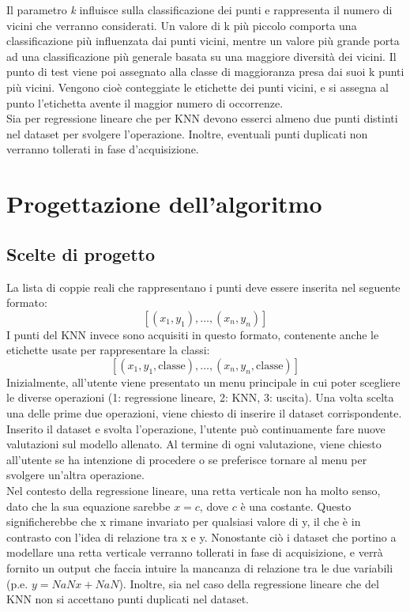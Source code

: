 \documentclass[11pt]{article}
\theoremstyle{definition}
\begin{document}
Il parametro \textit{k} influisce sulla classificazione dei punti e rappresenta il numero di vicini che verranno considerati. Un valore di k più piccolo comporta una classificazione più influenzata dai punti vicini, mentre un valore più grande porta ad una classificazione più generale basata su una maggiore diversità dei vicini. Il punto di test viene poi assegnato alla classe di maggioranza presa dai suoi k punti più vicini. Vengono cioè conteggiate le etichette dei punti vicini, e si assegna al punto l'etichetta avente il maggior numero di occorrenze.\\
\newline
Sia per regressione lineare che per KNN devono esserci almeno due punti distinti nel dataset per svolgere l'operazione. Inoltre, eventuali punti duplicati non verranno tollerati in fase d'acquisizione.

\newpage

\section{Progettazione dell'algoritmo}

\subsection{Scelte di progetto}
La lista di coppie reali che rappresentano i punti deve essere inserita nel seguente formato:
$$
[(x_1, y_1), \dots, (x_n, y_n)]
$$
I punti del KNN invece sono acquisiti in questo formato, contenente anche le etichette usate per rappresentare la classi:
$$
[(x_1, y_1, \text{classe}), \dots, (x_n, y_n, \text{classe})]
$$
Inizialmente, all'utente viene presentato un menu principale in cui poter scegliere le diverse operazioni (1: regressione lineare, 2: KNN, 3: uscita). Una volta scelta una delle prime due operazioni, viene chiesto di inserire il dataset corrispondente. Inserito il dataset e svolta l'operazione, l'utente può continuamente fare nuove valutazioni sul modello allenato. Al termine di ogni valutazione, viene chiesto all'utente se ha intenzione di procedere o se preferisce tornare al menu per svolgere un'altra operazione. \\
\newline
Nel contesto della regressione lineare, una retta verticale non ha molto senso, dato che la sua equazione sarebbe $x=c$, dove $c$ è una costante. Questo significherebbe che x rimane invariato per qualsiasi valore di y, il che è in contrasto con l'idea di relazione tra x e y. Nonostante ciò i dataset che portino a modellare una retta verticale verranno tollerati in fase di acquisizione, e verrà fornito un output che faccia intuire la mancanza di relazione tra le due variabili (p.e. $y=NaNx+NaN$).  Inoltre, sia nel caso della regressione lineare che del KNN non si accettano punti duplicati nel dataset.
\end{document}
